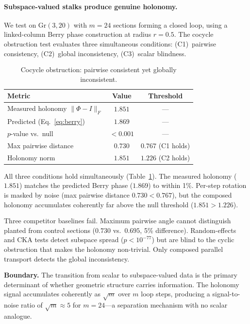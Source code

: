 \documentclass[11pt]{article}
\newcommand{\Gr}{\mathrm{Gr}}
\begin{document}
\paragraph{Subspace-valued stalks produce genuine holonomy.}
We test on $\Gr(3, 20)$ with $m = 24$ sections forming a closed loop, using a linked-column Berry phase construction at radius $r = 0.5$.
The cocycle obstruction test evaluates three simultaneous conditions: (C1)~pairwise consistency, (C2)~global inconsistency, (C3)~scalar blindness.

\begin{table}[t]
\centering
\caption{Cocycle obstruction: pairwise consistent yet globally inconsistent.}
\label{tab:cocycle}
\small
\begin{tabular}{@{}lcc@{}}
\toprule
\textbf{Metric} & \textbf{Value} & \textbf{Threshold} \\
\midrule
Measured holonomy $\|\Phi - I\|_F$ & $1.851$ & --- \\
Predicted (Eq.~\ref{eq:berry}) & $1.869$ & --- \\
$p$-value vs.\ null & $< 0.001$ & --- \\
\midrule
Max pairwise distance & $0.730$ & $0.767$ (C1 holds) \\
Holonomy norm & $1.851$ & $1.226$ (C2 holds) \\
\bottomrule
\end{tabular}
\end{table}

All three conditions hold simultaneously (Table~\ref{tab:cocycle}).
The measured holonomy ($1.851$) matches the predicted Berry phase ($1.869$) to within 1\%.
Per-step rotation is masked by noise (max pairwise distance $0.730 < 0.767$), but the composed holonomy accumulates coherently far above the null threshold ($1.851 > 1.226$).

Three competitor baselines fail.
Maximum pairwise angle cannot distinguish planted from control sections ($0.730$ vs.\ $0.695$, 5\% difference).
Random-effects and CKA tests detect subspace spread ($p < 10^{-77}$) but are blind to the cyclic obstruction that makes the holonomy non-trivial.
Only composed parallel transport detects the global inconsistency.

\textbf{Boundary.} The transition from scalar to subspace-valued data is the primary determinant of whether geometric structure carries information.
The holonomy signal accumulates coherently as $\sqrt{m}$ over $m$ loop steps, producing a signal-to-noise ratio of $\sqrt{m} \approx 5$ for $m = 24$---a separation mechanism with no scalar analogue.
\end{document}
